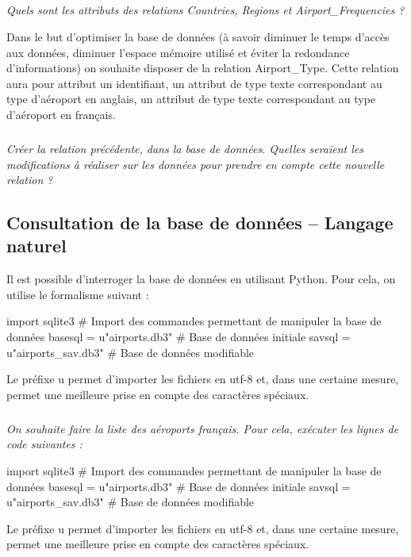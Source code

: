 \documentclass[10pt]{article}
\begin{document}
\subparagraph{}
\textit{Quels sont les attributs des relations \textsf{Countries}, \textsf{Regions} et \textsf{Airport\_Frequencies} ?}

Dans le but d'optimiser la base de données (à savoir diminuer le temps d'accès aux données, diminuer l'espace mémoire utilisé et éviter la redondance d'informations) on souhaite disposer de la relation \textsf{Airport\_Type}. Cette relation aura pour attribut un identifiant, un attribut de type texte correspondant au type d'aéroport en anglais, un attribut de type texte correspondant au type d'aéroport en français. 

\subparagraph{}
\textit{Créer la relation précédente, dans la base de données. Quelles seraient les modifications à réaliser sur les données pour prendre en compte cette nouvelle relation ?}

\subsection*{Consultation de la base de données -- Langage naturel}

Il est possible d'interroger la base de données en utilisant Python. Pour cela, on utilise le formalisme suivant :

\begin{py}
\begin{python}
import sqlite3 # Import des commandes permettant de manipuler la base de données
basesql = u"airports.db3" # Base de données initiale
savsql = u"airports_sav.db3" # Base de données modifiable
\end{python}

Le préfixe u permet d'importer les fichiers en utf-8 et, dans une certaine mesure, permet une meilleure prise en compte des caractères spéciaux.
\end{py}

\subparagraph{}
\textit{On souhaite faire la liste des aéroports français. Pour cela, exécuter les lignes de code suivantes :}

\begin{py}
\begin{python}
import sqlite3 # Import des commandes permettant de manipuler la base de données
basesql = u"airports.db3" # Base de données initiale
savsql = u"airports_sav.db3" # Base de données modifiable
\end{python}

Le préfixe u permet d'importer les fichiers en utf-8 et, dans une certaine mesure, permet une meilleure prise en compte des caractères spéciaux.
\end{py}
\end{document}
